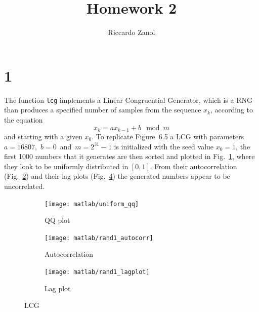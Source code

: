 \documentclass[a4paper,oneside]{article}
\author{Riccardo Zanol}
\title{Homework 2}
\newcommand{\inlinecode}[1]{\lstinline[basicstyle=\ttfamily,keywordstyle={},stringstyle={},commentstyle={\itshape}]{#1}}
\begin{document}
\maketitle
\section*{1}
The function \inlinecode{lcg} implements a Linear Congruential
Generator, which is a RNG than produces a specified number of samples
from the sequence $x_k$, according to the equation
\[ x_{k} = ax_{k-1} +b \mod m  \]
and starting with a given $x_0$.  To replicate Figure~6.5 a LCG with
parameters $a=16807$,~$b=0$~and~$m=2^{31}-1$ is initialized with the
seed value $x_0 = 1$, the first 1000 numbers that it generates are
then sorted and plotted in Fig.~\ref{plot:qqplot}, where they look to
be uniformly distributed in $[0,1]$.  From their autocorrelation
(Fig.~\ref{plot:autocorr}) and their lag plots
(Fig.~\ref{plot:lagplot}) the generated numbers appear to be
uncorrelated.
\begin{figure}[htbp]
  \centering
  \begin{subfigure}{0.5\textwidth}
    \centering
    \texttt{[image: matlab/uniform\_qq]}
    \caption{QQ plot}
    \label{plot:qqplot}
  \end{subfigure}%
  \begin{subfigure}{0.5\textwidth}
        \centering
    \texttt{[image: matlab/rand1\_autocorr]}
    \caption{Autocorrelation}
    \label{plot:autocorr}
  \end{subfigure}
  \begin{subfigure}{0.75\textwidth}
        \centering
    \texttt{[image: matlab/rand1\_lagplot]}
    \caption{Lag plot}
    \label{plot:lagplot}
  \end{subfigure}
  \caption{LCG}
\end{figure}
\end{document}
